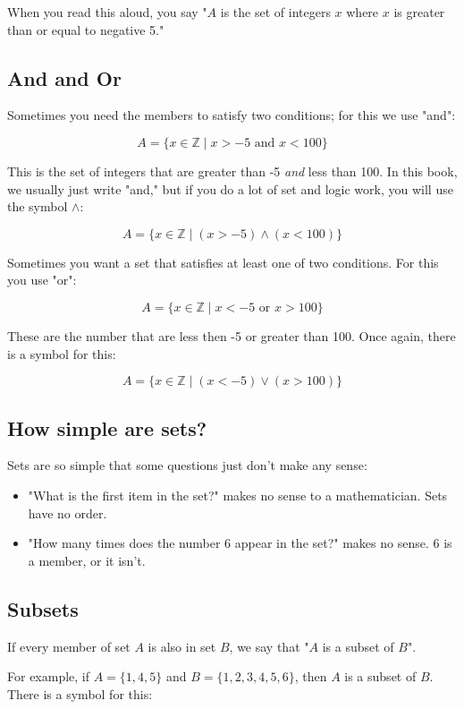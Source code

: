 When you read this aloud, you say "$A$ is the set of integers $x$
where $x$ is greater than or equal to negative 5."

\subsection{And and Or}


Sometimes you need the members to satisfy two conditions; for this we
use "and": 

$$A = \{ x \in \mathbb{Z} \mid x > -5 \text{ and }  x < 100\}$$

This is the set of integers that are greater than -5 \textit{and} less
than 100.  In this book, we usually just write "and," but if you do a
lot of set and logic work, you will use the symbol $\land$:

$$A = \{ x \in \mathbb{Z} \mid (x > -5) \land (x < 100)\}$$

Sometimes you want a set that satisfies at least one of two
conditions.  For this you use "or":

$$A = \{ x \in \mathbb{Z} \mid x < -5 \text{ or } x > 100\}$$

These are the number that are less then -5 or greater than 100.  Once
again, there is a symbol for this:

$$A = \{ x \in \mathbb{Z} \mid (x < -5) \lor (x > 100)\}$$

\subsection{How simple are sets?}

Sets are so simple that some questions just don't make any sense:
\begin{itemize}
\item "What is the first item in the set?" makes no sense to a mathematician.  Sets have no order.
\item "How many times does the number 6 appear in the set?"  makes no sense.   6 is a member, or it isn't.   
\end{itemize}

\subsection{Subsets}

If every member of set $A$ is also in set $B$, we say that "$A$ is a
subset of $B$". 

For example, if $A = \{1,4,5\}$ and $B = \{1,2,3,4,5,6\}$, then $A$ is
a subset of $B$.  There is a symbol for this:

